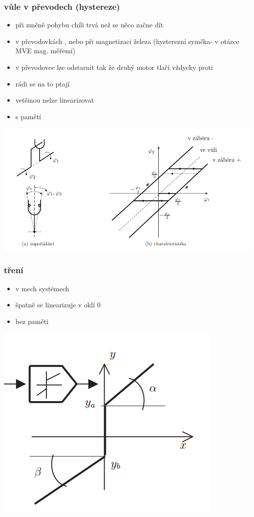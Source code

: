 \subsubsection*{vůle v převodech (hystereze)}
\begin{itemize}
    \item při změně pohybu chíli trvá než se něco začne dít
    \item v převodovkách , nebo při magnetizaci železa (hysterezní symčka- v otázce MVE mag. měřemí)
    \item v převodovce lze odstarnit tak že druhý motor tlačí vždycky proti
    \item rádi se na to ptají
    \item vetšinou nelze linearizovat
    \item s pamětí
\end{itemize}
\includegraphics{img/vule.png}

\subsubsection*{tření}
\begin{itemize}
    \item v mech systémech
    \item špatně se linearizuje v oklí 0
    \item bez paměti
\end{itemize}
\includegraphics{img/treni.png}

